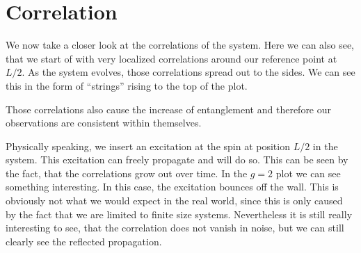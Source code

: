 




\section{Correlation}
We now take a closer look at the correlations of the system.
Here we can also see, that we start of with very localized correlations around our reference point at $L/2$.
As the system evolves, those correlations spread out to the sides.
We can see this in the form of \enquote{strings} rising to the top of the plot.

Those correlations also cause the increase of entanglement and therefore our observations are consistent within themselves.

Physically speaking, we insert an excitation at the spin at position $L/2$ in the system.
This excitation can freely propagate and will do so.
This can be seen by the fact, that the correlations grow out over time.
In the $g=2$ plot we can see something interesting.
In this case, the excitation bounces off the wall.
This is obviously not what we would expect in the real world, since this is only caused by the fact that we are limited to finite size systems.
Nevertheless it is still really interesting to see, that the correlation does not vanish in noise, but we can still clearly see the reflected propagation.

